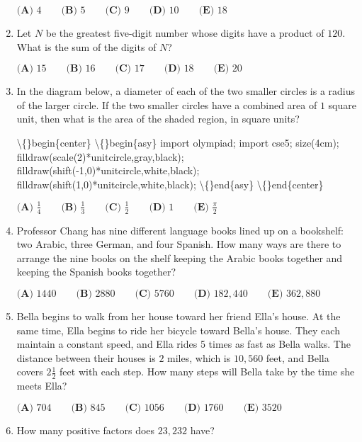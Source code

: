 \documentclass{article}
\begin{document}
\begin{enumerate}[label=\arabic*., itemsep=0.5em]
\(\textbf{(A) }4\qquad\textbf{(B) }5\qquad\textbf{(C) }9\qquad\textbf{(D) }10\qquad \textbf{(E) }18\)\par \vspace{0.5em}\item Let \(N\) be the greatest five-digit number whose digits have a product of \(120\). What is the sum of the digits of \(N\)?

\(\textbf{(A) }15\qquad\textbf{(B) }16\qquad\textbf{(C) }17
\qquad\textbf{(D) }18\qquad\textbf{(E) }20\)\par \vspace{0.5em}\item In the diagram below, a diameter of each of the two smaller circles is a radius of the larger circle. If the two smaller circles have a combined area of \(1\) square unit, then what is the area of the shaded region, in square units?


\textbackslash\{\}begin\{center\}
\textbackslash\{\}begin\{asy\}
import olympiad;
import cse5;
size(4cm);
filldraw(scale(2)*unitcircle,gray,black);
filldraw(shift(-1,0)*unitcircle,white,black);
filldraw(shift(1,0)*unitcircle,white,black);
\textbackslash\{\}end\{asy\}
\textbackslash\{\}end\{center\}


\(\textbf{(A) } \frac{1}{4} \qquad \textbf{(B) } \frac{1}{3} \qquad \textbf{(C) } \frac{1}{2} \qquad \textbf{(D) } 1 \qquad \textbf{(E) } \frac{\pi}{2}\)\par \vspace{0.5em}\item Professor Chang has nine different language books lined up on a bookshelf: two Arabic, three German, and four Spanish. How many ways are there to arrange the nine books on the shelf keeping the Arabic books together and keeping the Spanish books together?

\(\textbf{(A) }1440\qquad\textbf{(B) }2880\qquad\textbf{(C) }5760\qquad\textbf{(D) }182,440\qquad \textbf{(E) }362,880\)\par \vspace{0.5em}\item Bella begins to walk from her house toward her friend Ella's house. At the same time, Ella begins to ride her bicycle toward Bella's house. They each maintain a constant speed, and Ella rides 5 times as fast as Bella walks. The distance between their houses is \(2\) miles, which is \(10,560\) feet, and Bella covers \(2 \tfrac{1}{2}\) feet with each step. How many steps will Bella take by the time she meets Ella?

\(\textbf{(A) }704\qquad\textbf{(B) }845\qquad\textbf{(C) }1056\qquad\textbf{(D) }1760\qquad \textbf{(E) }3520\)\par \vspace{0.5em}\item How many positive factors does \(23,232\) have?


\end{enumerate}
\end{document}
